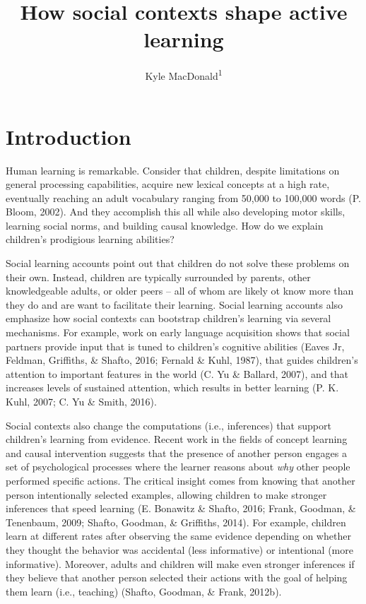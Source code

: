 \documentclass[english,floatsintext,man]{apa6}
\title{How social contexts shape active learning}
\author{Kyle MacDonald\textsuperscript{1}}
\affiliation{
    \vspace{0.5cm}
          \textsuperscript{1} Stanford University  }
\theoremstyle{definition}
\theoremstyle{definition}
\theoremstyle{definition}
\theoremstyle{remark}
\begin{document}
\maketitle

\setcounter{secnumdepth}{0}


  {
  \hypersetup{linkcolor=black}
  \setcounter{tocdepth}{2}
  \tableofcontents
  }

\newpage

\section{Introduction}\label{introduction}

Human learning is remarkable. Consider that children, despite
limitations on general processing capabilities, acquire new lexical
concepts at a high rate, eventually reaching an adult vocabulary ranging
from 50,000 to 100,000 words (P. Bloom, 2002). And they accomplish this
all while also developing motor skills, learning social norms, and
building causal knowledge. How do we explain children's prodigious
learning abilities?

Social learning accounts point out that children do not solve these
problems on their own. Instead, children are typically surrounded by
parents, other knowledgeable adults, or older peers -- all of whom are
likely ot know more than they do and are want to facilitate their
learning. Social learning accounts also emphasize how social contexts
can bootstrap children's learning via several mechanisms. For example,
work on early language acquisition shows that social partners provide
input that is tuned to children's cognitive abilities (Eaves Jr,
Feldman, Griffiths, \& Shafto, 2016; Fernald \& Kuhl, 1987), that guides
children's attention to important features in the world (C. Yu \&
Ballard, 2007), and that increases levels of sustained attention, which
results in better learning (P. K. Kuhl, 2007; C. Yu \& Smith, 2016).

Social contexts also change the computations (i.e., inferences) that
support children's learning from evidence. Recent work in the fields of
concept learning and causal intervention suggests that the presence of
another person engages a set of psychological processes where the
learner reasons about \emph{why} other people performed specific
actions. The critical insight comes from knowing that another person
intentionally selected examples, allowing children to make stronger
inferences that speed learning (E. Bonawitz \& Shafto, 2016; Frank,
Goodman, \& Tenenbaum, 2009; Shafto, Goodman, \& Griffiths, 2014). For
example, children learn at different rates after observing the same
evidence depending on whether they thought the behavior was accidental
(less informative) or intentional (more informative). Moreover, adults
and children will make even stronger inferences if they believe that
another person selected their actions with the goal of helping them
learn (i.e., teaching) (Shafto, Goodman, \& Frank, 2012b).
\end{document}
